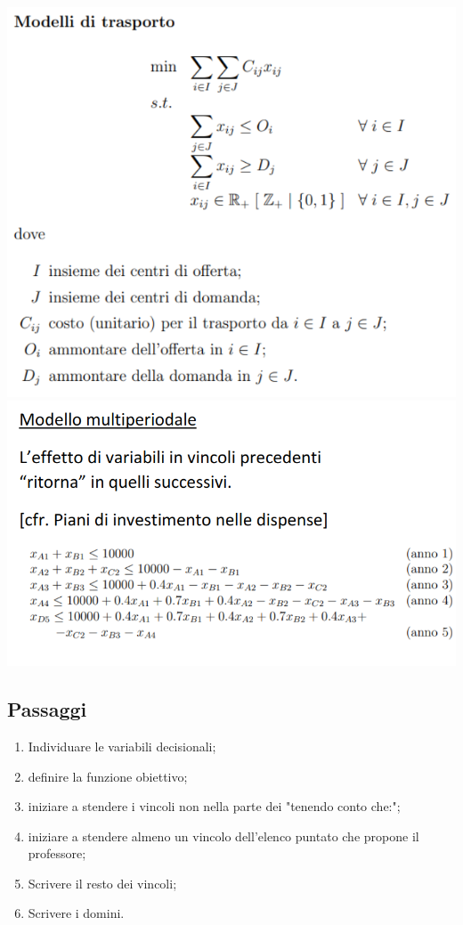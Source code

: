 \begin{multicols}{2}
\includegraphics[width=\linewidth]{img/trasporti.png}
\includegraphics[width=\linewidth]{img/multiperiodale.png}

\end{multicols}
\subsection{Passaggi}
\begin{enumerate}
    \item Individuare le variabili decisionali;
    \item definire la funzione obiettivo;
    \item iniziare a stendere i vincoli non nella parte dei "tenendo conto che:";
    \item iniziare a stendere almeno un vincolo dell'elenco puntato che propone il professore;
    \item Scrivere il resto dei vincoli;
    \item Scrivere i domini.
\end{enumerate}

